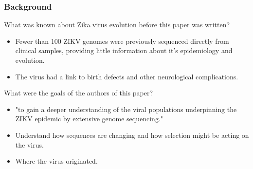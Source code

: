 \documentclass[12pt,a4paper]{article}
\begin{document}
\subsubsection{Background}
\begin{itemize}
    {\color{G-Moon}\item What was known about Zika virus evolution before this paper was written?}
        \begin{itemize}
            \item Fewer than 100 ZIKV genomes were previously sequenced directly from clinical samples, providing little information about it's epidemiology and evolution.
            \item The virus had a link to birth defects and other neurological complications.
        \end{itemize}
    {\color{G-Moon}\item What were the goals of the authors of this paper?}
        \begin{itemize}
            \item "to gain a deeper understanding of the viral populations underpinning the ZIKV epidemic by extensive genome sequencing."
            \item Understand how sequences are changing and how selection might be acting on the virus.
            \item Where the virus originated.
        \end{itemize}
\end{itemize}
\end{document}
